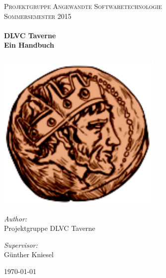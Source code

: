 \begin{titlepage}

\begin{center}



\textsc{\LARGE Projektgruppe Angewandte Softwaretechnologie}\\[1.5cm]

\textsc{\Large Sommersemester 2015}\\[0.5cm]

\HRule \\[0.4cm] { \huge \bfseries DLVC Taverne}\\[0.2cm]
{\large \bfseries Ein Handbuch}\\[0.4cm]

\HRule \\[1.5cm]

\includegraphics[width=0.6\textwidth]{Bilder/Logo3_1.png}\\[1cm]

\begin{minipage}{0.4\textwidth} \begin{flushleft} \large \emph{Author:}\\ Projektgruppe DLVC Taverne \end{flushleft} \end{minipage} \hfill \begin{minipage}{0.4\textwidth} \begin{flushright} \large \emph{Supervisor:} \\ Günther Kniesel \end{flushright} \end{minipage}

\vfill

{\large \today}

\end{center}

\end{titlepage}